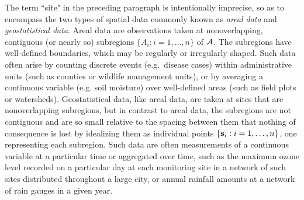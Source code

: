 The term ``site" in the preceding paragraph is intentionally imprecise, so as to encompass the two types of spatial data commonly known as {\em areal data} and {\em geostatistical data}.  Areal data are observations taken at nonoverlapping, contiguous (or nearly so) subregions $\{A_i:i=1,\ldots,n\}$ of ${\cal A}$.  The subregions have well-defined boundaries, which may be regularly or irregularly shaped.  Such data often arise by counting discrete events (e.g.\ disease cases) within administrative units (such as counties or wildlife management units), or by averaging a continuous variable (e.g. soil moisture) over well-defined areas (such as field plots or watersheds).  Geostatistical data, like areal data, are taken at sites that are nonoverlapping subregions, but in contrast to areal data, the subregions are not contiguous and are so small relative to the spacing between them that nothing of consequence is lost by idealizing them as individual points $\{{\bf s}_i: i=1,\ldots,n\}$, one representing each subregion.  Such data are often measurements of a continuous variable at a particular time or aggregated over time, such as the maximum ozone level recorded on a particular day at each monitoring site in a network of such sites distributed throughout a large city, or annual rainfall amounts at a network of rain gauges in a given year.

